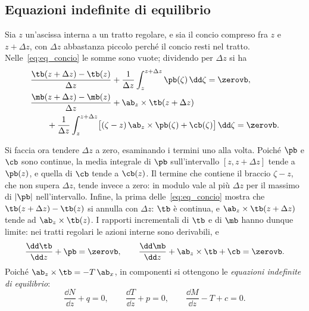 \subsection{Equazioni indefinite di equilibrio}
\label{sec:eq_indefinite}

Sia $z$ un'ascissa interna a un tratto regolare, e sia
il concio compreso fra $z$ e $z + \Delta z$, con
$\Delta z$ abbastanza piccolo perché il concio resti nel
tratto. Nelle~\eqref{eq:eq_concio} le somme sono vuote;
dividendo per $\Delta z$ si ha
\begin{equation}\label{eq:rapporti_incrementali}
	\begin{aligned}
		&\frac{\tb(z+\Delta z) - \tb(z)}{\Delta z}
		+ \frac{1}{\Delta z}\int_z^{z+\Delta z} \pb(\zeta)\,\dd\zeta = \zerovb,\\
		&\frac{\mb(z+\Delta z) - \mb(z)}{\Delta z}
		+ \ab_z \times \tb(z+\Delta z)\\
		&\qquad + \frac{1}{\Delta z}\int_z^{z+\Delta z}
		\bigl[(\zeta - z)\,\ab_z \times \pb(\zeta) + \cb(\zeta)\bigr]\,\dd\zeta = \zerovb.
	\end{aligned}
\end{equation}

Si faccia ora tendere $\Delta z$ a zero, esaminando i
termini uno alla volta. Poiché $\pb$ e $\cb$ sono
continue, la media integrale di $\pb$ sull'intervallo
$[z, z + \Delta z]$ tende a $\pb(z)$, e quella di $\cb$
tende a $\cb(z)$. Il termine che contiene il braccio
$\zeta - z$, che non supera $\Delta z$, tende invece a
zero: in modulo vale al più $\Delta z$ per il massimo
di $|\pb|$ nell'intervallo. Infine,
la prima delle~\eqref{eq:eq_concio} mostra che
$\tb(z + \Delta z) - \tb(z)$ si annulla con $\Delta z$:
$\tb$ è continua, e $\ab_z \times \tb(z + \Delta z)$
tende ad $\ab_z \times \tb(z)$. I rapporti incrementali
di $\tb$ e di $\mb$ hanno dunque limite: nei tratti
regolari le azioni interne sono derivabili, e
\begin{equation*}
	\frac{\dd \tb}{\dd z} + \pb = \zerovb, \qquad
	\frac{\dd \mb}{\dd z} + \ab_z \times \tb + \cb = \zerovb.
\end{equation*}
Poiché $\ab_z \times \tb = -T\,\ab_x$, in componenti si
ottengono le \emph{equazioni indefinite di
	equilibrio}:
\begin{equation}\label{eq:eq_indefinite}
	\frac{\dd N}{\dd z} + q = 0,
	\qquad
	\frac{\dd T}{\dd z} + p = 0,
	\qquad
	\frac{\dd M}{\dd z} - T + c = 0.
\end{equation}

